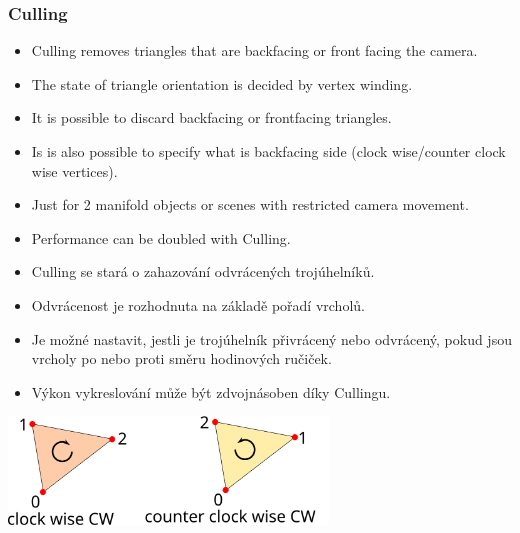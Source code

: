 \begin{frame}
\frametitle{Culling}
  \scriptsize
	\begin{itemize}
		\item Culling removes triangles that are backfacing or front facing the camera.
    \item The state of triangle orientation is decided by vertex winding.
    \item It is possible to discard backfacing or frontfacing triangles.
    \item Is is also possible to specify what is backfacing side (clock wise/counter clock wise vertices).
    \item Just for 2 manifold objects or scenes with restricted camera movement.
    \item Performance can be doubled with Culling.
	\end{itemize}
	\begin{itemize}
		\item Culling se stará o zahazování odvrácených trojúhelníků.
    \item Odvrácenost je rozhodnuta na základě pořadí vrcholů.
    \item Je možné nastavit, jestli je trojúhelník přivrácený nebo odvrácený, pokud jsou vrcholy po nebo proti směru hodinových ručiček.
    \item Výkon vykreslování může být zdvojnásoben díky Cullingu.
	\end{itemize}
	\includegraphics[width=8.5cm,keepaspectratio]{pics/pipeline/culling}
\end{frame}

